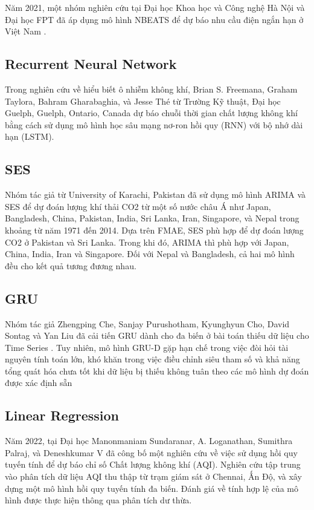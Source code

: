 \documentclass[conference]{IEEEtran}
\begin{document}
Năm 2021, một nhóm nghiên cứu tại Đại học Khoa học và Công nghệ Hà Nội và Đại học FPT đã áp dụng mô hình NBEATS để dự báo nhu cầu điện ngắn hạn ở Việt Nam \cite{b9}.

\subsection{Recurrent Neural Network}
Trong nghiên cứu về hiểu biết ô nhiễm không khí, Brian S. Freemana, Graham Taylora, Bahram Gharabaghia, và Jesse Thé từ Trường Kỹ thuật, Đại học Guelph, Guelph, Ontario, Canada dự báo chuỗi thời gian chất lượng không khí bằng cách sử dụng mô hình học sâu mạng nơ-ron hồi quy (RNN) với bộ nhớ dài hạn (LSTM). \cite{b10}

\subsection{SES}
Nhóm tác giả từ University of Karachi, Pakistan đã sử dụng mô hình ARIMA và SES để dự đoán lượng khí thải CO2 từ một số nước châu Á như Japan, Bangladesh, China, Pakistan, India, Sri Lanka, Iran, Singapore, và Nepal trong khoảng từ năm 1971 đến 2014. Dựa trên FMAE, SES phù hợp để dự đoán lượng CO2 ở Pakistan và Sri Lanka. Trong khi đó, ARIMA thì phù hợp với Japan, China, India, Iran và Singapore. Đối với Nepal và Bangladesh, cả hai mô hình đều cho kết quả tương đương nhau. \cite{b11}

\subsection{GRU}
Nhóm tác giả Zhengping Che, Sanjay Purushotham, Kyunghyun Cho, David Sontag và Yan Liu đã cải tiến GRU dành cho đa biến ở bài toán thiếu dữ liệu cho Time Series \cite{che2016recurrent}. Tuy nhiên, mô hình GRU-D gặp hạn chế trong việc đòi hỏi tài nguyên tính toán lớn, khó khăn trong việc điều chỉnh siêu tham số và khả năng tổng quát hóa chưa tốt khi dữ liệu bị thiếu không tuân theo các mô hình dự đoán được xác định sẵn

\subsection{Linear Regression}
Năm 2022, tại Đại học Manonmaniam Sundaranar, A. Loganathan, Sumithra Palraj, và Deneshkumar V đã công bố một nghiên cứu về việc sử dụng hồi quy tuyến tính để dự báo chỉ số Chất lượng không khí (AQI). Nghiên cứu tập trung vào phân tích dữ liệu AQI thu thập từ trạm giám sát ở Chennai, Ấn Độ, và xây dựng một mô hình hồi quy tuyến tính đa biến. Đánh giá về tính hợp lệ của mô hình được thực hiện thông qua phân tích dư thừa. \cite{b18}
\end{document}
